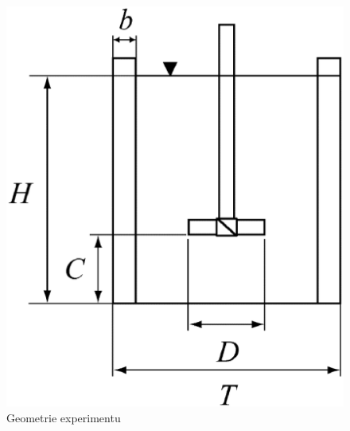 \begin{figure}[h!]
\begin{center}
\includegraphics[scale=0.44]{images/mujedit.eps}
\caption{Geometrie experimentu}
\label{fig:nadoba}
\end{center}
\end{figure} 

\vspace{-12mm}

